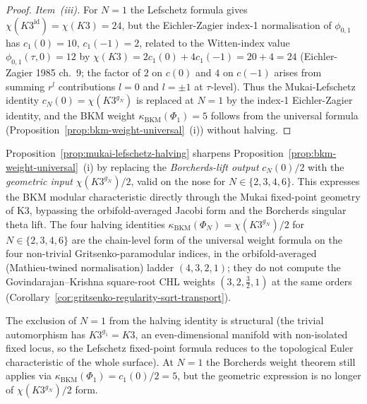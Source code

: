 \begin{proof}
\textit{Item~(iii).} For $N = 1$ the Lefschetz formula gives
$\chi(K3^{\mathrm{id}}) = \chi(K3) = 24$, but the Eichler-Zagier index-1
normalisation of $\phi_{0,1}$ has $c_1(0) = 10$, $c_1(-1) = 2$, related
to the Witten-index value $\phi_{0,1}(\tau, 0) = 12$ by
$\chi(K3) = 2 c_1(0) + 4 c_1(-1) = 20 + 4 = 24$
\textup{(Eichler-Zagier 1985 ch.~9; the factor of $2$ on $c(0)$ and $4$
on $c(-1)$ arises from summing $r^l$ contributions $l = 0$ and
$l = \pm 1$ at $\tau$-level).} Thus the Mukai-Lefschetz identity
$c_N(0) = \chi(K3^{g_N})$ is replaced at $N = 1$ by the index-1
Eichler-Zagier identity, and the BKM weight $\kappa_{\mathrm{BKM}}(\Phi_1) = 5$
follows from the universal formula (Proposition~\ref{prop:bkm-weight-universal}~(i))
without halving.
\end{proof}

\begin{remark}
\label{rem:mukai-lefschetz-strengthening}
Proposition~\ref{prop:mukai-lefschetz-halving} sharpens
Proposition~\ref{prop:bkm-weight-universal}~(i) by replacing the
\emph{Borcherds-lift output} $c_N(0)/2$ with the \emph{geometric input}
$\chi(K3^{g_N})/2$, valid on the nose for $N \in \{2, 3, 4, 6\}$. This
expresses the BKM modular characteristic directly through the Mukai
fixed-point geometry of K3, bypassing the orbifold-averaged Jacobi
form and the Borcherds singular theta lift. The four halving identities
$\kappa_{\mathrm{BKM}}(\Phi_N) = \chi(K3^{g_N})/2$ for $N \in \{2,3,4,6\}$
are the chain-level form of the universal weight formula on the four
non-trivial Gritsenko-paramodular indices, in the orbifold-averaged
(Mathieu-twined normalisation) ladder $(4, 3, 2, 1)$; they do not
compute the Govindarajan--Krishna square-root CHL weights
$(3, 2, \tfrac32, 1)$ at the same orders
(Corollary~\ref{cor:gritsenko-regularity-sqrt-transport}).

The exclusion of $N = 1$ from the halving identity is structural
(the trivial automorphism has $K3^{g_1} = K3$, an even-dimensional
manifold with non-isolated fixed locus, so the Lefschetz fixed-point
formula reduces to the topological Euler characteristic of the whole
surface). At $N = 1$ the Borcherds weight theorem still applies via
$\kappa_{\mathrm{BKM}}(\Phi_1) = c_1(0)/2 = 5$, but the geometric
expression is no longer of $\chi(K3^{g_N})/2$ form.
\end{remark}

